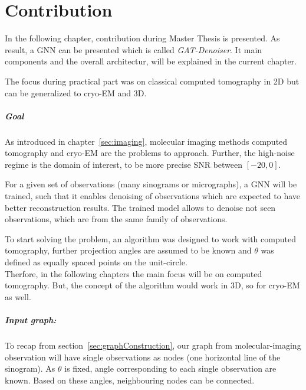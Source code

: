 \chapter{Contribution}
\label{sec:contribution}

In the following chapter, contribution during Master Thesis is presented.
As result, a GNN can be presented which is called \textit{GAT-Denoiser}.
It main components and the overall architectur, will be explained in the current chapter.

The focus during practical part was on classical computed tomography in 2D but
can be generalized to cryo-EM and 3D.


\paragraph{Goal}
As introduced in chapter~\ref{sec:imaging}, molecular imaging methods computed tomography and cryo-EM are the problems
to approach. Further, the high-noise regime is the domain of interest, to be more precise SNR between $[-20, 0]$.

For a given set of observations (many sinograms or micrographs), a GNN will be trained, such that
it enables denoising of observations which are expected to have better reconstruction results.
The trained model allows to denoise not seen observations, which are from the same family of observations.


\begin{tcolorbox}[colback=red!5!white,colframe=red!75!black]
  To start solving the problem, an algorithm was designed to work with computed tomography, further
  projection angles are assumed to be known and $\theta$ was defined as equally spaced points on the unit-circle. \\

  Therfore, in the following chapters the main focus will be on computed tomography. 
  But, the concept of the algorithm would work in 3D, so for cryo-EM as well.
\end{tcolorbox}

\paragraph{Input graph:}
To recap from section~\ref{sec:graphConstruction}, our graph from molecular-imaging observation
will have single observations as nodes (one horizontal line of the sinogram). 
As $\theta$ is fixed, angle corresponding to each single observation are known. 
Based on these angles, neighbouring nodes can be connected.



